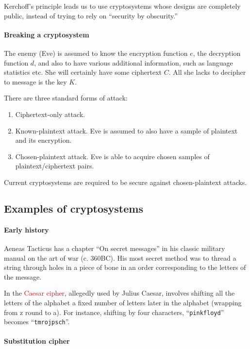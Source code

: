 \documentclass[a4paper, 11pt, openany]{book}
\numberwithin{equation}{section}
\theoremstyle{plain}
\theoremstyle{definition}
\newcommand{\Important}[1]{\textcolor{red}{#1}}
\begin{document}
Kerchoff's principle leads us to use cryptosystems whose designs are completely public, instead of trying to rely on ``security by obscurity.''


\paragraph{Breaking a cryptosystem}
The enemy (Eve) is assumed to know the encryption function $e$, the decryption function $d$, and also to have various additional information, such as language statistics etc.
She will certainly have some ciphertext $C$.
All she lacks to decipher to message is the key $K$.

There are three standard forms of attack:
\begin{enumerate}
    \item Ciphertext-only attack.
    
    \item Known-plaintext attack.
Eve is assumed to also have a sample of plaintext and its encryption.

    \item Chosen-plaintext attack.
Eve is able to acquire chosen samples of plaintext/ciphertext pairs.
\end{enumerate}
Current cryptosystems are required to be secure against chosen-plaintext attacks.




\subsection{Examples of cryptosystems}

\paragraph{Early history}
Aeneas Tacticus has a chapter ``On secret messages'' in his classic military manual on the art of war (c. 360BC).
His most secret method was to thread a string through holes in a piece of bone in an order corresponding to the letters of the message.


In the \Important{Caesar cipher}, allegedly used by Julius Caesar, involves shifting all the letters of the alphabet a fixed number of letters later in the alphabet (wrapping from z round to a). For instance, shifting by four characters, ``\texttt{pinkfloyd}'' becomes ``\texttt{tmrojpsch}''.


\paragraph{Substitution cipher}
\end{document}
